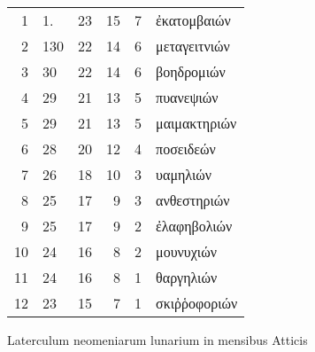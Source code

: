 %
\normalsize
\centering
\begin{tabular}{r|llrr|l}
 1 & 1.   & 23 & 15 & 7 &\textgreek{ἐκατομβαιών} \\
 2 & 1\textbar{}30 & 22 & 14 & 6 &\textgreek{μεταγειτνιών} \\
 3 & 30   & 22 & 14 & 6 &\textgreek{βοηδρομιών} \\
 4 & 29   & 21 & 13 & 5 &\textgreek{πυανεψιών} \\
 5 & 29   & 21 & 13 & 5 &\textgreek{μαιμακτηριών} \\
 6 & 28   & 20 & 12 & 4 &\textgreek{ποσειδεών} \\
 7 & 26   & 18 & 10 & 3 &\textgreek{υαμηλιών} \\
 8 & 25   & 17 &  9 & 3 &\textgreek{ανθεστηριών} \\
 9 & 25   & 17 &  9 & 2 &\textgreek{ἐλαφηβολιών} \\
10 & 24   & 16 &  8 & 2 &\textgreek{μουνυχιών} \\
11 & 24   & 16 &  8 & 1 &\textgreek{θαργηλιών} \\
12 & 23   & 15 &  7 & 1 &\textgreek{σκιῤῥοφοριών} \\
\end{tabular}
%
\caption{Laterculum neomeniarum lunarium in mensibus Atticis}
\label{tab:p034}
%
